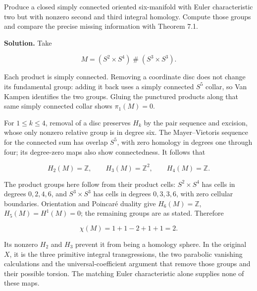 Produce a closed simply connected oriented six-manifold with Euler characteristic two but with nonzero second and third integral homology. Compute those groups and compare the precise missing information with Theorem 7.1.

\textbf{Solution.} Take

\begin{equation}
M=(S^2\times S^4)\mathbin{\#}(S^3\times S^3).
\label{courseIII:integral-homology-and-sphere-recognition:eq:11.9}
\end{equation}

Each product is simply connected. Removing a coordinate disc does not change its fundamental group: adding it back uses a simply connected \(S^5\) collar, so Van Kampen identifies the two groups. Gluing the punctured products along that same simply connected collar shows \(\pi_1(M)=0\).

For \(1\leq k\leq4\), removal of a disc preserves \(H_k\) by the pair sequence and excision, whose only nonzero relative group is in degree six. The Mayer--Vietoris sequence for the connected sum has overlap \(S^5\), with zero homology in degrees one through four; its degree-zero maps also show connectedness. It follows that

\begin{equation}
H_2(M)=\mathbb Z,\qquad H_3(M)=\mathbb Z^2,\qquad H_4(M)=\mathbb Z.
\label{courseIII:integral-homology-and-sphere-recognition:eq:11.10}
\end{equation}

The product groups here follow from their product cells: \(S^2\times S^4\) has cells in degrees \(0,2,4,6\), and \(S^3\times S^3\) has cells in degrees \(0,3,3,6\), with zero cellular boundaries. Orientation and Poincaré duality give \(H_6(M)=\mathbb Z\), \(H_5(M)=H^1(M)=0\); the remaining groups are as stated. Therefore

\begin{equation}
\chi(M)=1+1-2+1+1=2.
\label{courseIII:integral-homology-and-sphere-recognition:eq:11.11}
\end{equation}

Its nonzero \(H_2\) and \(H_3\) prevent it from being a homology sphere. In the original \(X\), it is the three primitive integral transgressions, the two parabolic vanishing calculations and the universal-coefficient argument that remove those groups and their possible torsion. The matching Euler characteristic alone supplies none of these maps.
